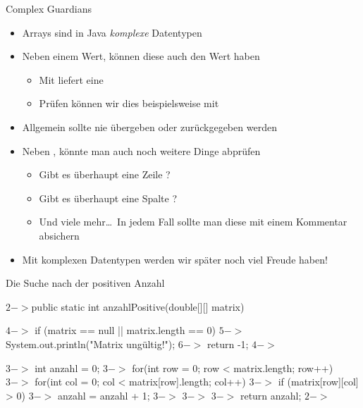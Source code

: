 \iffull
{\AddonFrame
\begin{frame}{Complex Guardians}
\begin{itemize}[<+(1)->]
    \itemsep11pt
    \item Arrays sind in Java \emph{komplexe} Datentypen 
    \item Neben einem  Wert, können diese auch den Wert  haben \begin{itemize}
        \item Mit  liefert  eine 
        \item Prüfen können wir dies beispielsweise mit 
    \end{itemize}
    \item Allgemein sollte nie  übergeben oder zurückgegeben werden
    \item Neben , könnte man auch noch weitere Dinge abprüfen \begin{itemize}
        \item Gibt es überhaupt eine Zeile ?
        \item Gibt es überhaupt eine Spalte ?
        \item Und viele mehr\ldots\ In jedem Fall sollte man diese mit einem Kommentar absichern
    \end{itemize}
    \item Mit komplexen Datentypen werden wir später noch viel Freude haben!
\end{itemize}
\end{frame}
}\fi

\begin{frame}[c,fragile]{Die Suche nach der positiven Anzahl}
\DoAnimations{}
\begin{plainjava}
$2->$public static int anzahlPositive(double[][] matrix) {
$4->$    if (matrix == null || matrix.length == 0) {
$5->$        System.out.println("Matrix ungültig!");
$6->$        return -1;
$4->$    }

$3->$    int anzahl = 0;
$3->$    for(int row = 0; row < matrix.length; row++) {
$3->$        for(int col = 0; col < matrix[row].length; col++) {
$3->$            if (matrix[row][col] > 0)
$3->$                anzahl = anzahl + 1;
$3->$        }
$3->$    }
$3->$    return anzahl;
$2->$}
\end{plainjava}
\end{frame}

